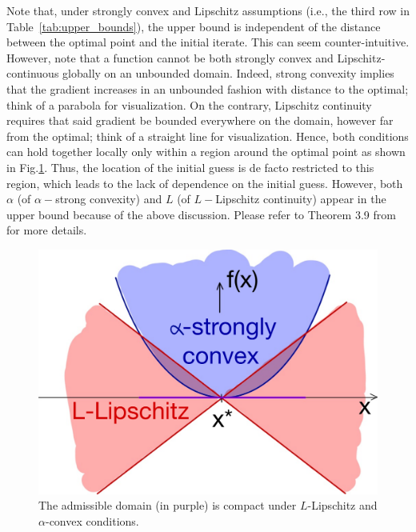 \documentclass{article}
\begin{document}
Note that, under strongly convex and Lipschitz assumptions (i.e., the third row in Table~\ref{tab:upper_bounds}), the upper bound is independent of the distance between the optimal point and the initial iterate. 
This can seem counter-intuitive. 
However, note that a function cannot be both strongly convex and Lipschitz-continuous globally on an unbounded domain. 
Indeed, strong convexity implies that the gradient increases in an unbounded fashion with distance to the optimal; think of a parabola for visualization.
On the contrary, Lipschitz continuity requires that said gradient be bounded everywhere on the domain, however far from the optimal; think of a straight line for visualization. 
Hence, both conditions can hold together locally only within a region around the optimal point as shown in Fig.\ref{fig:l_lipschitz_alpha_conv}. 
Thus, the location of the initial guess is de facto restricted to this region, which leads to the lack of dependence on the initial guess.
However, both $\alpha$ (of $\alpha-$strong convexity) and $L$ (of $L-$Lipschitz continuity) appear in the upper bound because of the above discussion. 
Please refer to Theorem 3.9 from~\cite{bubeck} for more details.

\begin{figure}[h]
    \centering
    \includegraphics[scale=0.15]{img/L_Lipschitz_alpha_convex.pdf}
    \caption{The admissible domain (in purple) is compact under $L$-Lipschitz and $\alpha$-convex  conditions.\label{fig:l_lipschitz_alpha_conv}}
\end{figure}
\end{document}
